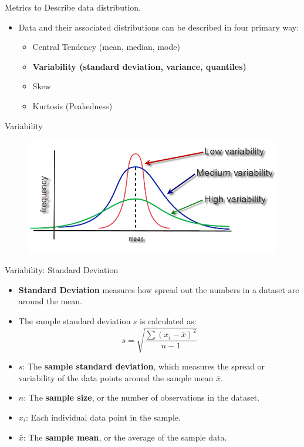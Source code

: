 \documentclass[
  ignorenonframetext,
]{beamer}
\providecommand{\tightlist}{%
  \setlength{\itemsep}{0pt}\setlength{\parskip}{0pt}}
\begin{document}
\begin{frame}{Metrics to Describe data distribution.}
\label{metrics-to-describe-data-distribution.-2}
\begin{itemize}
\item
  Data and their associated distributions can be described in four
  primary way:

  \begin{itemize}
  \tightlist
  \item
    Central Tendency (mean, median, mode)
  \item
    \textbf{Variability (standard deviation, variance, quantiles)}
  \item
    Skew
  \item
    Kurtosis (Peakedness)
  \end{itemize}
\end{itemize}
\end{frame}

\begin{frame}{Variability}
\label{variability}
\begin{figure}
\includegraphics[width=0.8\linewidth]{fig/variability} \end{figure}
\end{frame}

\begin{frame}{Variability: Standard Deviation}
\label{variability-standard-deviation}
\begin{itemize}
\tightlist
\item
  \textbf{Standard Deviation} measures how spread out the numbers in a
  dataset are around the mean.
\end{itemize}

\begin{itemize}
\item
  The sample standard deviation \(s\) is calculated as:
  \[s = \sqrt{\frac{\sum (x_i - \bar{x})^2}{n - 1}}\]
\item
  \(s\): The \textbf{sample standard deviation}, which measures the
  spread or variability of the data points around the sample mean
  \(\bar{x}\).
\item
  \(n\): The \textbf{sample size}, or the number of observations in the
  dataset.
\item
  \(x_i\): Each individual data point in the sample.
\item
  \(\bar{x}\): The \textbf{sample mean}, or the average of the sample
  data.
\end{itemize}
\end{frame}
\end{document}
